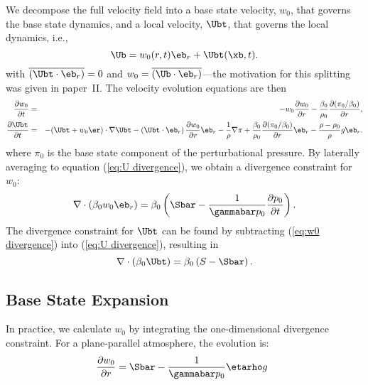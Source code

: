 We decompose the full velocity field into a base state velocity,
$w_0$, that governs the base state dynamics, and a local velocity,
$\Ubt$, that governs the local dynamics, i.e., 
\begin{equation}
\Ub = w_0(r,t)\eb_r + \Ubt(\xb,t).
\end{equation}
with
$\overline{(\Ubt\cdot\eb_r)} = 0$ and
$w_0 = \overline{(\Ub\cdot\eb_r)}$---the motivation for this splitting was given in paper~II.
The velocity evolution equations are then 
\begin{eqnarray}
\frac{\partial w_0}{\partial t} &=& -w_0\frac{\partial w_0}{\partial
  r} - \frac{\beta_0}{\rho_0}\frac{\partial(\pi_0/\beta_0)}{\partial r},\label{eq:w0
  evolution}\\ 
%
\frac{\partial\Ubt}{\partial t} &=& -(\Ubt + w_0\er)\cdot\nabla\Ubt
  - \left(\Ubt\cdot\eb_r\right)\frac{\partial w_0}{\partial r}\eb_r -
\frac{1}{\rho}\nabla\pi +
\frac{\beta_0}{\rho_0}\frac{\partial(\pi_0/\beta_0)}{\partial r}\eb_r -
\frac{\rho-\rho_0}{\rho}g\eb_r.\label{eq:utildeupd}
\end{eqnarray}
where $\pi_0$ is the base state component of the perturbational pressure.
By laterally averaging to equation (\ref{eq:U divergence}),
we obtain a divergence constraint for $w_0$:
\begin{equation}
\nabla\cdot(\beta_0 w_0 \eb_r) = 
    \beta_0\left(\Sbar - \frac{1}{\gammabar p_0}
           \frac{\partial p_0}{\partial t}\right).\label{eq:w0 divergence}
\end{equation}
The divergence constraint for $\Ubt$ can be found by subtracting
(\ref{eq:w0 divergence}) into (\ref{eq:U divergence}), resulting in
\begin{equation}
\nabla\cdot\left(\beta_0\Ubt\right) = \beta_0\left(S-\Sbar\right).\label{eq:utilde divergence}
\end{equation}



\subsection{Base State Expansion}


In practice, we calculate $w_0$ by integrating
the one-dimensional divergence constraint.  For a plane-parallel atmosphere, the
evolution is:
\begin{equation}
\label{eq:flow:dw0dr_planar}
\frac{\partial w_0}{\partial r} = \Sbar - \frac{1}{\gammabar p_0} \etarho g \enskip 
\end{equation}

